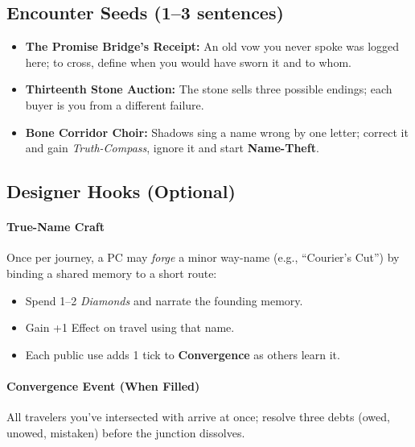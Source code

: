 \subsection*{Encounter Seeds (1–3 sentences)}

\begin{itemize}
\item \textbf{The Promise Bridge’s Receipt:} An old vow you never spoke was logged here; to cross, define when you would have sworn it and to whom.
\item \textbf{Thirteenth Stone Auction:} The stone sells three possible endings; each buyer is you from a different failure.
\item \textbf{Bone Corridor Choir:} Shadows sing a name wrong by one letter; correct it and gain \emph{Truth-Compass}, ignore it and start \textbf{Name-Theft}.
\end{itemize}
\subsection*{Designer Hooks (Optional)}

\paragraph{True-Name Craft}
Once per journey, a PC may \emph{forge} a minor way-name (e.g., “Courier’s Cut”) by binding a shared memory to a short route:
\begin{itemize}
\item Spend 1–2 \emph{Diamonds} and narrate the founding memory.
\item Gain +1 Effect on travel using that name. 
\item Each public use adds 1 tick to \textbf{Convergence} as others learn it.
\end{itemize}

\paragraph{Convergence Event (When Filled)}
All travelers you’ve intersected with arrive at once; resolve three debts (owed, unowed, mistaken) before the junction dissolves.


